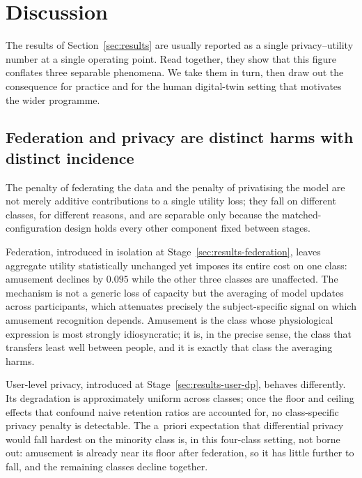 
\section{Discussion}
\label{sec:discussion}

The results of Section~\ref{sec:results} are usually reported as a single
privacy--utility number at a single operating point. Read together, they show
that this figure conflates three separable phenomena. We take them in turn, then
draw out the consequence for practice and for the human digital-twin setting that
motivates the wider programme.

\subsection{Federation and privacy are distinct harms with distinct incidence}
\label{sec:disc-decomposition}

The penalty of federating the data and the penalty of privatising the model are
not merely additive contributions to a single utility loss; they fall on
different classes, for different reasons, and are separable only because the
matched-configuration design holds every other component fixed between stages.

Federation, introduced in isolation at Stage~\ref{sec:results-federation},
leaves aggregate utility statistically unchanged yet imposes its entire cost on
one class: amusement declines by $0.095$ while the other three classes are
unaffected. The mechanism is not a generic loss of capacity but the averaging of
model updates across participants, which attenuates precisely the
subject-specific signal on which amusement recognition depends. Amusement is the
class whose physiological expression is most strongly idiosyncratic; it is,
in the precise sense, the class that transfers least well between people, and it
is exactly that class the averaging harms.

User-level privacy, introduced at Stage~\ref{sec:results-user-dp}, behaves
differently. Its degradation is approximately uniform across classes; once the
floor and ceiling effects that confound naive retention ratios are accounted
for, no class-specific privacy penalty is detectable. The a~priori expectation
that differential privacy would fall hardest on the minority class is, in this
four-class setting, not borne out: amusement is already near its floor after
federation, so it has little further to fall, and the remaining classes decline
together.

